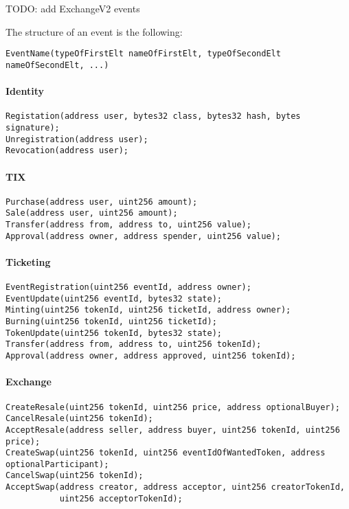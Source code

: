 \documentclass[a4paper,11pt,oneside]{report}
\begin{document}
TODO: add ExchangeV2 events

The structure of an event is the following: 
\begin{verbatim}
EventName(typeOfFirstElt nameOfFirstElt, typeOfSecondElt nameOfSecondElt, ...)
\end{verbatim}



\paragraph{Identity}
\begin{verbatim}
Registation(address user, bytes32 class, bytes32 hash, bytes signature);
Unregistration(address user);
Revocation(address user);
\end{verbatim}

\paragraph{TIX}
\begin{verbatim}
Purchase(address user, uint256 amount);
Sale(address user, uint256 amount);
Transfer(address from, address to, uint256 value);
Approval(address owner, address spender, uint256 value);
\end{verbatim}

\paragraph{Ticketing}
\begin{verbatim}
EventRegistration(uint256 eventId, address owner);
EventUpdate(uint256 eventId, bytes32 state);
Minting(uint256 tokenId, uint256 ticketId, address owner);
Burning(uint256 tokenId, uint256 ticketId);
TokenUpdate(uint256 tokenId, bytes32 state);
Transfer(address from, address to, uint256 tokenId);
Approval(address owner, address approved, uint256 tokenId);
\end{verbatim}

\paragraph{Exchange}
\begin{verbatim}
CreateResale(uint256 tokenId, uint256 price, address optionalBuyer);
CancelResale(uint256 tokenId);
AcceptResale(address seller, address buyer, uint256 tokenId, uint256 price);
CreateSwap(uint256 tokenId, uint256 eventIdOfWantedToken, address optionalParticipant);
CancelSwap(uint256 tokenId);
AcceptSwap(address creator, address acceptor, uint256 creatorTokenId, 
           uint256 acceptorTokenId);
\end{verbatim}
\end{document}

